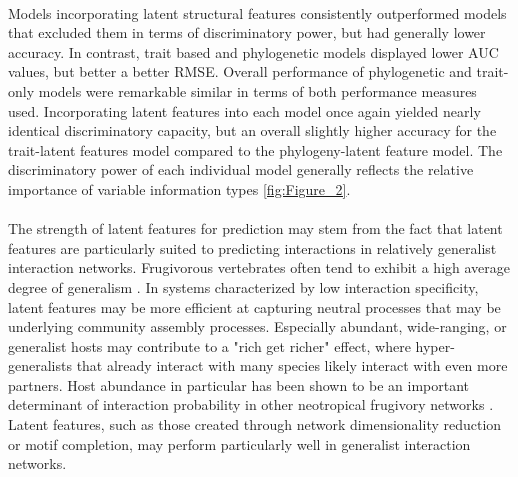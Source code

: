\documentclass[openacc]{rsproca_new}%
\begin{document}
\paragraph*{}
Models incorporating latent structural features consistently outperformed models that excluded them in terms of discriminatory power, but had generally lower accuracy. In contrast, trait based and phylogenetic models displayed lower AUC values, but better a better RMSE. Overall performance of phylogenetic and trait-only models were remarkable similar in terms of both performance measures used. Incorporating latent features into each model once again yielded nearly identical discriminatory  capacity, but an overall slightly higher accuracy for the trait-latent features model compared to the phylogeny-latent feature model. The discriminatory power of each individual model generally reflects the relative importance of variable information types \ref{fig:Figure_2}. 

\paragraph*{}
The strength of latent features for prediction may stem from the fact that latent features are particularly suited to predicting interactions in relatively generalist interaction networks. Frugivorous vertebrates often tend to exhibit a high average degree of generalism \cite{richardson2000plant}. In systems characterized by low interaction specificity, latent features may be more efficient at capturing neutral processes that may be underlying community assembly processes. Especially abundant, wide-ranging, or generalist hosts may contribute to a "rich get richer" effect, where hyper-generalists that already interact with many species likely interact with even more partners. Host abundance in particular has been shown to be an important determinant of interaction probability in other neotropical frugivory networks \cite{laurindo2020drivers}. Latent features, such as those created through network dimensionality reduction or motif completion, may perform particularly well in generalist interaction networks. 
\end{document}
